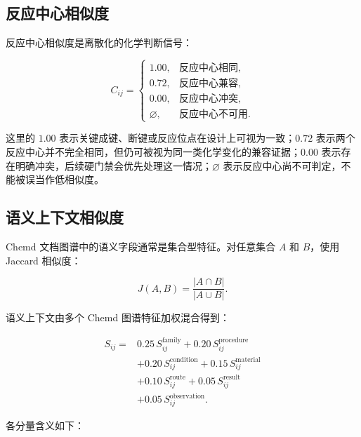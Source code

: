 \documentclass[11pt]{article}
\numberwithin{equation}{section}
\begin{document}
\subsection{反应中心相似度}

反应中心相似度是离散化的化学判断信号：

\begin{equation}
C_{ij}
=
\begin{cases}
1.00, & \text{反应中心相同}, \\
0.72, & \text{反应中心兼容}, \\
0.00, & \text{反应中心冲突}, \\
\varnothing, & \text{反应中心不可用}.
\end{cases}
\end{equation}

这里的 \(1.00\) 表示关键成键、断键或反应位点在设计上可视为一致；\(0.72\) 表示两个反应中心并不完全相同，但仍可被视为同一类化学变化的兼容证据；\(0.00\) 表示存在明确冲突，后续硬门禁会优先处理这一情况；\(\varnothing\) 表示反应中心尚不可判定，不能被误当作低相似度。

\subsection{语义上下文相似度}

Chemd 文档图谱中的语义字段通常是集合型特征。对任意集合 \(A\) 和 \(B\)，使用 Jaccard 相似度：

\begin{equation}
J(A,B)
=
\frac{|A \cap B|}{|A \cup B|}.
\end{equation}

语义上下文由多个 Chemd 图谱特征加权混合得到：

\begin{equation}
\begin{aligned}
S_{ij}
=
& 0.25\,S^{\mathrm{family}}_{ij}
+ 0.20\,S^{\mathrm{procedure}}_{ij} \\
&+ 0.20\,S^{\mathrm{condition}}_{ij}
+ 0.15\,S^{\mathrm{material}}_{ij} \\
&+ 0.10\,S^{\mathrm{route}}_{ij}
+ 0.05\,S^{\mathrm{result}}_{ij} \\
&+ 0.05\,S^{\mathrm{observation}}_{ij}.
\end{aligned}
\end{equation}

各分量含义如下：
\end{document}
